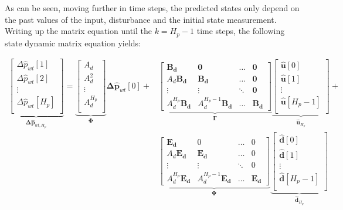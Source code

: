 As can be seen, moving further in time steps, the predicted states only depend on the past values of the input, disturbance and the initial state measurement. Writing up the matrix equation until the $k = H_p - 1$ time steps, the following state dynamic matrix equation yields:

\begin{align}
\underbrace{\begin{bmatrix}
\Delta \hat p_{wt}[1] \\ 
\Delta \hat p_{wt}[2]\\ 
\vdots \\ 
\Delta \hat p_{wt}[H_p]\\ 
\end{bmatrix}}_{\bm{\Delta \hat{p}}_{wt,H_p}}
=
\underbrace{\begin{bmatrix}
A_d \\ 
A_d^2\\ 
\vdots \\ 
A_d^{H_p}\\ 
\end{bmatrix}}_{\bm{\Phi}}
\bm{\Delta \hat{p}}_{wt}[0]+\nonumber
&
\underbrace{\begin{bmatrix}
 \bm{B_d}& \bm{0} & \hdots  & \bm{0}\\ 
 A_d\bm{B_d}&  \bm{B_d}& \hdots & \bm{0}\\ 
\vdots &\vdots  & \ddots  & \bm{0}\\ 
 A_d^{H_p}\bm{B_d}& A_d^{H_p-1}\bm{B_d}  & \hdots  & \bm{B_d}
\end{bmatrix}}_{\bm{\Gamma}}
\underbrace{\begin{bmatrix}
 \bm{\hat{u}}[0] \\ 
 \bm{\hat{u}}[1]\\ 
\vdots \\ 
 \bm{\hat{u}}[H_p-1]\\ 
\end{bmatrix}}_{\bm{\hat{u}}_{H_p}}
+ \\
&
\underbrace{\begin{bmatrix}
 \bm{E_d}& 0 & \hdots  & 0\\ 
 A_d\bm{E_d}&  \bm{E_d}& \hdots & 0\\ 
\vdots &\vdots  & \ddots  & 0\\ 
 A_d^{H_p}\bm{E_d}& A_d^{H_p-1}\bm{E_d}  & \hdots  & \bm{E_d}
\end{bmatrix}}_{\bm{\Psi}}
\underbrace{\begin{bmatrix}
 \bm{\hat{d}}[0] \\ 
 \bm{\hat{d}}[1]\\ 
\vdots \\ 
 \bm{\hat{d}}[H_p-1]\\ 
\end{bmatrix}}_{\bm{\hat{d}}_{H_p}} 
\end{align}

